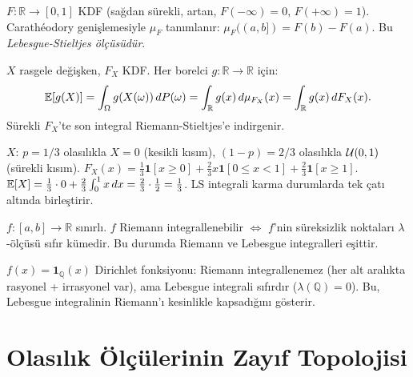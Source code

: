 \begin{tanim}\label{def:ls_olcusu}
$F:\mathbb{R}\to[0,1]$ KDF (sağdan sürekli, artan, $F(-\infty)=0$, $F(+\infty)=1$). Carathéodory genişlemesiyle $\mu_F$ tanımlanır: $\mu_F((a,b])=F(b)-F(a)$. Bu \emph{Lebesgue-Stieltjes ölçüsüdür}.
\end{tanim}

\begin{teorem}\label{thm:beklenti_ls}
$X$ rasgele değişken, $F_X$ KDF. Her borelci $g:\mathbb{R}\to\mathbb{R}$ için:
\[
  \mathbb{E}[g(X)] = \int_\Omega g(X(\omega))\,dP(\omega) = \int_\mathbb{R} g(x)\,d\mu_{F_X}(x)
  = \int_\mathbb{R} g(x)\,dF_X(x).
\]
Sürekli $F_X$'te son integral Riemann-Stieltjes'e indirgenir.
\end{teorem}

\begin{ornek}\label{ex:karma_beklenti}
$X$: $p=1/3$ olasılıkla $X=0$ (kesikli kısım), $(1-p)=2/3$ olasılıkla $\mathcal{U}(0,1)$ (sürekli kısım).
$F_X(x)=\frac13\mathbf{1}[x\geq0]+\frac23 x\mathbf{1}[0\leq x<1]+\frac23\mathbf{1}[x\geq1]$.
$\mathbb{E}[X]=\frac13\cdot0+\frac23\int_0^1x\,dx=\frac23\cdot\frac12=\frac13$.
LS integrali karma durumlarda tek çatı altında birleştirir.
\end{ornek}

\begin{teorem}\label{thm:riemann_lebesgue}
$f:[a,b]\to\mathbb{R}$ sınırlı. $f$ Riemann integrallenebilir $\iff$ $f$'nin süreksizlik noktaları $\lambda$-ölçüsü sıfır kümedir. Bu durumda Riemann ve Lebesgue integralleri eşittir.
\end{teorem}

\begin{hataanalizi}
$f(x)=\mathbf{1}_\mathbb{Q}(x)$ Dirichlet fonksiyonu: Riemann integrallenemez (her alt aralıkta rasyonel + irrasyonel var), ama Lebesgue integrali sıfırdır ($\lambda(\mathbb{Q})=0$). Bu, Lebesgue integralinin Riemann'ı kesinlikle kapsadığını gösterir.
\end{hataanalizi}

\section{Olasılık Ölçülerinin Zayıf Topolojisi}
\label{sec:zayif_topoloji}

